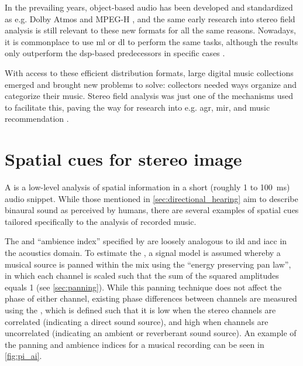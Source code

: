 In the prevailing years, object-based audio has been developed and standardized as e.g. Dolby Atmos \cite{DolbyAtmosNextGenerationAudioforCinema} and MPEG-H \cite{mpeg-h}, and the same early research into stereo field analysis is still relevant to these new formats for all the same reasons. Nowadays, it is commonplace to use \gls{ml} or \gls{dl} to perform the same tasks, although the results only outperform the \gls{dsp}-based predecessors in specific cases \cite{cobosOverviewMachineLearning2022}.

With access to these efficient distribution formats, large digital music collections emerged and brought new problems to solve: collectors needed ways organize and categorize their music. Stereo field analysis was just one of the mechanisms used to facilitate this, paving the way for research into e.g. \gls{agr}, \gls{mir}, and music recommendation \cite{guausAudioContentProcessing2009,harmaClassificationTimefrequencyRegions2010,defferrardFMADatasetMusic2017}.

\newpage

\section{Spatial cues for stereo image}
\label{sec:spatial_cues}

A  is a low-level analysis of spatial information in a short (roughly \num{1} to \SI{100}{\milli \s}) audio snippet. While those mentioned in \cref{sec:directional_hearing} aim to describe binaural sound as perceived by humans, there are several examples of spatial cues tailored specifically to the analysis of recorded music.

The  and \enquote{ambience index} specified by \citeauthor{avendanoFrequencyDomainTechniques2002} \cite{avendanoFrequencyDomainTechniques2002} are loosely analogous to \gls{ild} and \gls{iacc} in the acoustics domain. To estimate the , a signal model is assumed whereby a musical source is panned within the mix using the \enquote{energy preserving pan law}, in which each channel is scaled such that the sum of the squared amplitudes equals 1 (see \cref{sec:panning}). While this panning technique does not affect the phase of either channel, existing phase differences between channels are measured using the , which is defined such that it is low when the stereo channels are correlated (indicating a direct sound source), and high when channels are uncorrelated (indicating an ambient or reverberant sound source). An example of the panning and ambience indices for a musical recording can be seen in \cref{fig:pi_ai}.

